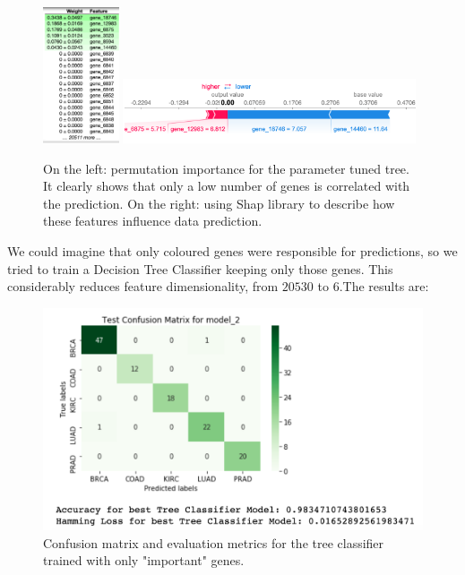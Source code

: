 \documentclass{article}
\begin{document}
\begin{figure}[hbt]
\centering
\includegraphics[width=0.2\textwidth]{img/perm}
\includegraphics[width=0.77\textwidth]{img/shap.png}
\caption{On the left: permutation importance for the parameter tuned tree. It clearly shows that only a low number of genes is correlated with the prediction. On the right: using Shap library to describe how these features influence data prediction.}
\label{fig_perm}
\end{figure}

We could imagine that only coloured genes were responsible for predictions, so we tried to train a Decision Tree Classifier keeping only those genes. This considerably reduces feature dimensionality, from $20530$ to $6$.The results are:

\begin{figure}[h!]
\centering
\includegraphics[width=\linewidth]{img/perm_matrix}
\caption{Confusion matrix and evaluation metrics for the tree classifier trained with only "important" genes.}
\label{fig_perm_m}
\end{figure}
\end{document}
